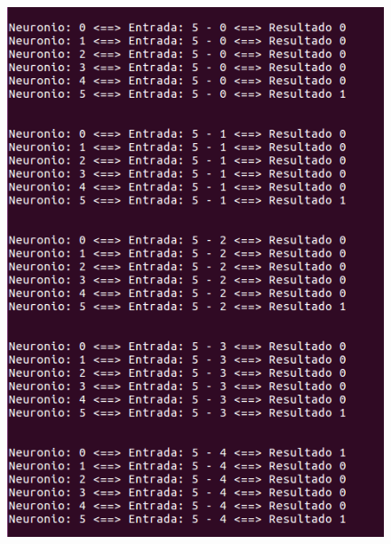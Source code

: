 \documentclass[hidelinks,12pt]{article}
\begin{document}
		\begin{figure}[!h]
			\centering
			\includegraphics[scale=0.5]{Figures/E3S5P1.png}
		\end{figure}
		
\end{document}
